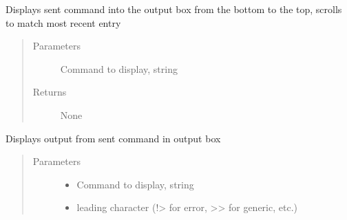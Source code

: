 \documentclass[letterpaper,10pt,english]{sphinxmanual}
\begin{document}
\begin{fulllineitems}
\begin{fulllineitems}
\begin{quote}
\begin{description}
\end{description}\end{quote}

\end{fulllineitems}


\begin{fulllineitems}
\label{\detokenize{index:HDF5Browser.FileBrowser.__sendCommand}}
\sphinxAtStartPar
Displays sent command into the output box from the bottom to the top, scrolls to match most recent entry
\begin{quote}\begin{description}
\item[{Parameters}] \leavevmode
\sphinxAtStartPar
{} \textendash{} Command to display, string

\item[{Returns}] \leavevmode
\sphinxAtStartPar
None

\end{description}\end{quote}

\end{fulllineitems}


\begin{fulllineitems}
\label{\detokenize{index:HDF5Browser.FileBrowser.__sendOutput}}
\sphinxAtStartPar
Displays output from sent command in output box
\begin{quote}\begin{description}
\item[{Parameters}] \leavevmode\begin{itemize}
\item {} 
\sphinxAtStartPar
{} \textendash{} Command to display, string

\item {} 
\sphinxAtStartPar
{} \textendash{} leading character (!\textgreater{} for error, \textgreater{}\textgreater{} for generic, etc.)


\end{itemize}
\end{description}
\end{quote}
\end{fulllineitems}
\end{fulllineitems}
\end{document}
